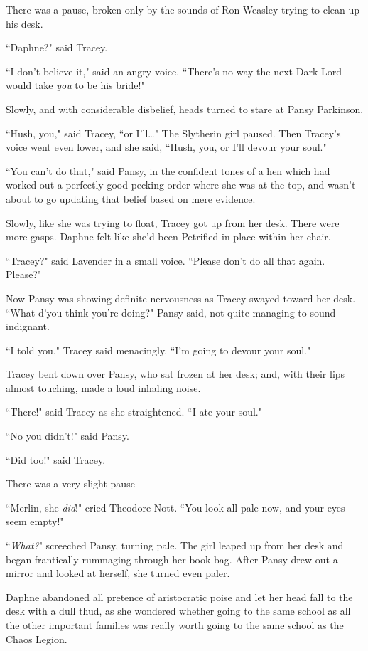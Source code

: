 There was a pause, broken only by the sounds of Ron Weasley trying to clean up his desk.

``Daphne?" said Tracey.

``I don't believe it," said an angry voice. ``There's no way the next Dark Lord would take \emph{you} to be his bride!"

Slowly, and with considerable disbelief, heads turned to stare at Pansy Parkinson.

``Hush, you," said Tracey, ``or I'll{\ldots}" The Slytherin girl paused. Then Tracey's voice went even lower, and she said, ``Hush, you, or I'll devour your soul."

``You can't do that," said Pansy, in the confident tones of a hen which had worked out a perfectly good pecking order where she was at the top, and wasn't about to go updating that belief based on mere evidence.

Slowly, like she was trying to float, Tracey got up from her desk. There were more gasps. Daphne felt like she'd been Petrified in place within her chair.

``Tracey?" said Lavender in a small voice. ``Please don't do all that again. Please?"

Now Pansy was showing definite nervousness as Tracey swayed toward her desk. ``What d'you think you're doing?" Pansy said, not quite managing to sound indignant.

``I told you," Tracey said menacingly. ``I'm going to devour your soul."

Tracey bent down over Pansy, who sat frozen at her desk; and, with their lips almost touching, made a loud inhaling noise.

``There!" said Tracey as she straightened. ``I ate your soul."

``No you didn't!" said Pansy.

``Did too!" said Tracey.

There was a very slight pause—

``Merlin, she \emph{did}!" cried Theodore Nott. ``You look all pale now, and your eyes seem empty!"

``\emph{What?}" screeched Pansy, turning pale. The girl leaped up from her desk and began frantically rummaging through her book bag. After Pansy drew out a mirror and looked at herself, she turned even paler.

Daphne abandoned all pretence of aristocratic poise and let her head fall to the desk with a dull thud, as she wondered whether going to the same school as all the other important families was really worth going to the same school as the Chaos Legion.

